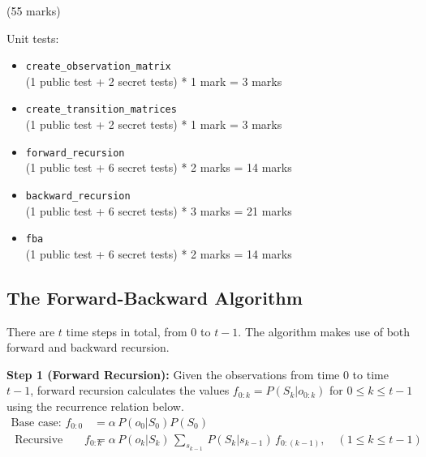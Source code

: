 \documentclass[12pt]{article}
\begin{document}
\begin{markscheme}
(55 marks)

Unit tests:
\begin{itemize}
    \item \verb+create_observation_matrix+ \\
    (1 public test + 2 secret tests) * 1 mark = 3 marks
    
    \item \verb+create_transition_matrices+ \\
    (1 public test + 2 secret tests) * 1 mark = 3 marks
    
    \item \verb+forward_recursion+ \\
    (1 public test + 6 secret tests) * 2 marks = 14 marks
    
    \item \verb+backward_recursion+ \\
    (1 public test + 6 secret tests) * 3 marks = 21 marks
    
    \item \verb+fba+ \\
    (1 public test + 6 secret tests) * 2 marks = 14 marks
\end{itemize}
    
\end{markscheme}

\newpage
\subsection{The Forward-Backward Algorithm}
\label{sec:forward_backward_algorithm}

There are $t$ time steps in total, from $0$ to $t-1$. The algorithm makes use of both forward and backward recursion.

{\bf Step 1 (Forward Recursion): } Given the observations from time $0$ to time $t - 1$, forward recursion calculates the values $f_{0:k} = P(S_k | o_{0:k} )$ for $0 \le k \le t - 1$ using the recurrence relation below. 
%
\begin{align}
    \text{Base case: } f_{0:0} & = \alpha \, P(o_0 | S_0) P(S_0) \\
    \text{ Recursive case: } f_{0:k} & = \alpha \, P(o_k | S_k) \, \sum_{s_{k-1}} \, P(S_k | s_{k-1}) \, f_{0:(k-1)},\quad (1 \le k \le t - 1) 
\end{align}
\end{document}
